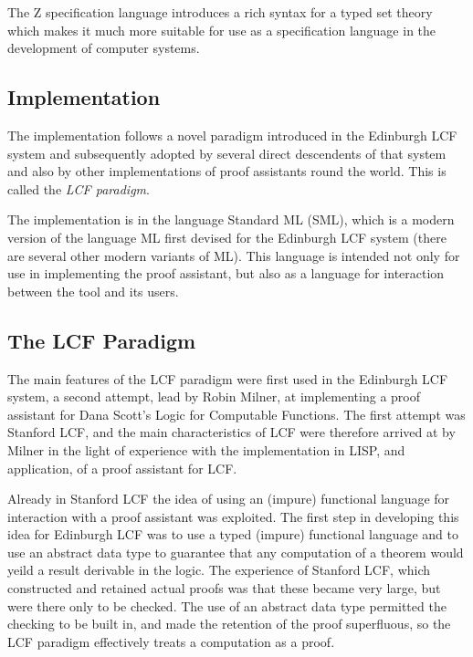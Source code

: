 \documentclass{rbjk}
\begin{document}
\begin{article}
The Z specification language introduces a rich syntax for a typed set
theory which makes it much more suitable for use as a specification
language in the development of computer systems.

\subsection{Implementation}

The implementation follows a novel paradigm introduced in the
Edinburgh LCF system and subsequently adopted by several direct
descendents of that system and also by other implementations of proof
assistants round the world.
This is called the {\it LCF paradigm}.

The implementation is in the language Standard ML (SML), which is a
modern version of the language ML first devised for the Edinburgh LCF
system (there are several other modern variants of ML).
This language is intended not only for use in implementing the proof
assistant, but also as a language for interaction between the tool and
its users.

\subsection{The LCF Paradigm}

The main features of the LCF paradigm were first used in the Edinburgh
LCF system, a second attempt, lead by Robin Milner, at implementing a
proof assistant for Dana Scott's Logic for Computable Functions.
The first attempt was Stanford LCF, and the main characteristics of
LCF were therefore arrived at by Milner in the light of experience
with the implementation in LISP, and application, of a proof assistant
for LCF.

Already in Stanford LCF the idea of using an (impure) functional
language for interaction with a proof assistant was exploited.
The first step in developing this idea for Edinburgh LCF was to use a
typed (impure) functional language and to use an abstract data type to
guarantee that any computation of a theorem would yeild a result
derivable in the logic.
The experience of Stanford LCF, which constructed and retained actual
proofs was that these became very large, but were there only to be
checked.
The use of an abstract data type permitted the checking to be built
in, and made the retention of the proof superfluous, so the LCF
paradigm effectively treats a computation as a proof.


\end{article}
\end{document}
